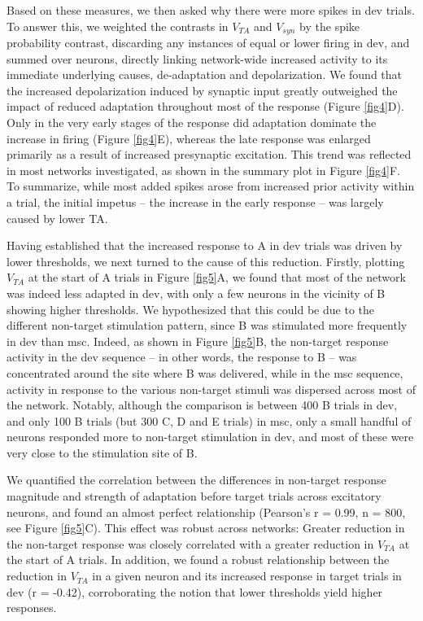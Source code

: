 \documentclass[pdflatex,iicol,sn-basic]{sn-jnl}
\theoremstyle{thmstyleone}%
\theoremstyle{thmstyletwo}%
\theoremstyle{thmstylethree}%
\begin{document}
Based on these measures, we then asked why there were more spikes in dev trials. To answer this, we weighted the contrasts in $V_{TA}$ and $V_{syn}$ by the spike probability contrast, discarding any instances of equal or lower firing in dev, and summed over neurons, directly linking network-wide increased activity to its immediate underlying causes, de-adaptation and depolarization. We found that the increased depolarization induced by synaptic input greatly outweighed the impact of reduced adaptation throughout most of the response (Figure \ref{fig4}D). Only in the very early stages of the response did adaptation dominate the increase in firing (Figure \ref{fig4}E), whereas the late response was enlarged primarily as a result of increased presynaptic excitation. This trend was reflected in most networks investigated, as shown in the summary plot in Figure \ref{fig4}F. To summarize, while most added spikes arose from increased prior activity within a trial, the initial impetus -- the increase in the early response -- was largely caused by lower TA.

Having established that the increased response to A in dev trials was driven by lower thresholds, we next turned to the cause of this reduction. Firstly, plotting $V_{TA}$ at the start of A trials in Figure \ref{fig5}A, we found that most of the network was indeed less adapted in dev, with only a few neurons in the vicinity of B showing higher thresholds. We hypothesized that this could be due to the different non-target stimulation pattern, since B was stimulated more frequently in dev than msc. Indeed, as shown in Figure \ref{fig5}B, the non-target response activity in the dev sequence -- in other words, the response to B -- was concentrated around the site where B was delivered, while in the msc sequence, activity in response to the various non-target stimuli was dispersed across most of the network. Notably, although the comparison is between 400 B trials in dev, and only 100 B trials (but 300 C, D and E trials) in msc, only a small handful of neurons responded more to non-target stimulation in dev, and most of these were very close to the stimulation site of B.

We quantified the correlation between the differences in non-target response magnitude and strength of adaptation before target trials across excitatory neurons, and found an almost perfect relationship (Pearson's r = 0.99, n = 800, see Figure \ref{fig5}C). This effect was robust across networks: Greater reduction in the non-target response was closely correlated with a greater reduction in $V_{TA}$ at the start of A trials. In addition, we found a robust relationship between the reduction in $V_{TA}$ in a given neuron and its increased response in target trials in dev (r = -0.42), corroborating the notion that lower thresholds yield higher responses.
\end{document}
